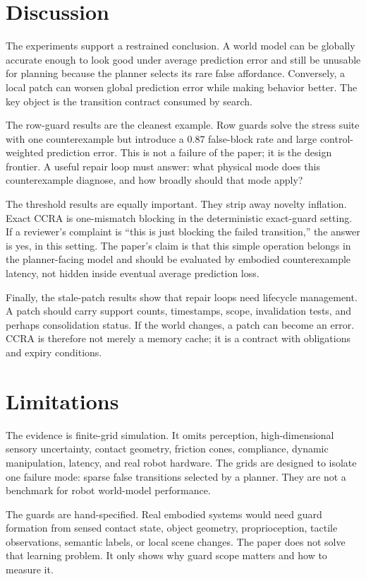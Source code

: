 \documentclass{article}
\begin{document}
\section{Discussion}

The experiments support a restrained conclusion. A world model can be globally accurate enough to look good under average prediction error and still be unusable for planning because the planner selects its rare false affordance. Conversely, a local patch can worsen global prediction error while making behavior better. The key object is the transition contract consumed by search.

The row-guard results are the cleanest example. Row guards solve the stress suite with one counterexample but introduce a 0.87 false-block rate and large control-weighted prediction error. This is not a failure of the paper; it is the design frontier. A useful repair loop must answer: what physical mode does this counterexample diagnose, and how broadly should that mode apply?

The threshold results are equally important. They strip away novelty inflation. Exact CCRA is one-mismatch blocking in the deterministic exact-guard setting. If a reviewer's complaint is ``this is just blocking the failed transition,'' the answer is yes, in this setting. The paper's claim is that this simple operation belongs in the planner-facing model and should be evaluated by embodied counterexample latency, not hidden inside eventual average prediction loss.

Finally, the stale-patch results show that repair loops need lifecycle management. A patch should carry support counts, timestamps, scope, invalidation tests, and perhaps consolidation status. If the world changes, a patch can become an error. CCRA is therefore not merely a memory cache; it is a contract with obligations and expiry conditions.

\section{Limitations}

The evidence is finite-grid simulation. It omits perception, high-dimensional sensory uncertainty, contact geometry, friction cones, compliance, dynamic manipulation, latency, and real robot hardware. The grids are designed to isolate one failure mode: sparse false transitions selected by a planner. They are not a benchmark for robot world-model performance.

The guards are hand-specified. Real embodied systems would need guard formation from sensed contact state, object geometry, proprioception, tactile observations, semantic labels, or local scene changes. The paper does not solve that learning problem. It only shows why guard scope matters and how to measure it.
\end{document}
